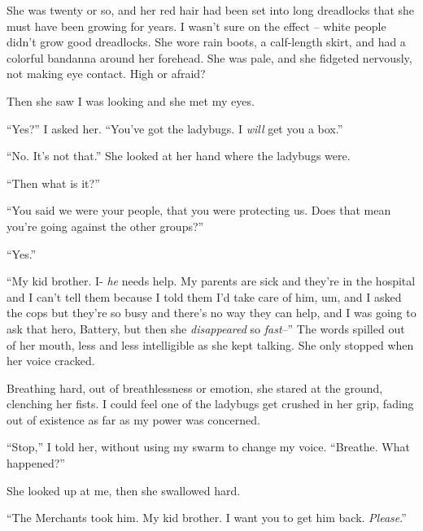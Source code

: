 She was twenty or so, and her red hair had been set into long dreadlocks that she must have been growing for years.  I wasn't sure on the effect – white people didn't grow good dreadlocks.  She wore rain boots, a calf-length skirt, and had a colorful bandanna around her forehead.  She was pale, and she fidgeted nervously, not making eye contact.  High or afraid?



Then she saw I was looking and she met my eyes.



``Yes?'' I asked her.  ``You've got the ladybugs.  I \emph{will} get you a box.''



``No.  It's not that.''  She looked at her hand where the ladybugs were.



``Then what is it?''



``You said we were your people, that you were protecting us.  Does that mean you're going against the other groups?''



``Yes.''



``My kid brother.  I- \emph{he} needs help.  My parents are sick and they're in the hospital and I can't tell them because I told them I'd take care of him, um, and I asked the cops but they're so busy and there's no way they can help, and I was going to ask that hero, Battery, but then she \emph{disappeared} so \emph{fast}--''  The words spilled out of her mouth, less and less intelligible as she kept talking.  She only stopped when her voice cracked.



Breathing hard, out of breathlessness or emotion, she stared at the ground, clenching her fists.  I could feel one of the ladybugs get crushed in her grip, fading out of existence as far as my power was concerned.



``Stop,'' I told her, without using my swarm to change my voice.  ``Breathe.  What happened?''



She looked up at me, then she swallowed hard.



``The Merchants took him.  My kid brother.  I want you to get him back.  \emph{Please}.''



